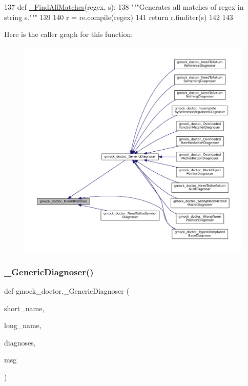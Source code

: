 \begin{DoxyCode}
137 \textcolor{keyword}{def }\hyperlink{namespacegmock__doctor_af9f6b7d876afcfe52864f2b928f5e6ab}{\_FindAllMatches}(regex, s):
138   \textcolor{stringliteral}{"""Generates all matches of regex in string s."""}
139 
140   r = re.compile(regex)
141   \textcolor{keywordflow}{return} r.finditer(s)
142 
143 
\end{DoxyCode}
Here is the caller graph for this function\+:
\nopagebreak
\begin{figure}[H]
\begin{center}
\leavevmode
\includegraphics[width=350pt]{namespacegmock__doctor_af9f6b7d876afcfe52864f2b928f5e6ab_icgraph}
\end{center}
\end{figure}
\mbox{\label{namespacegmock__doctor_af5023d3e12d1f4a7171c6b035783de84}} 
\subsubsection{\texorpdfstring{\+\_\+\+Generic\+Diagnoser()}{\_GenericDiagnoser()}}
{\footnotesize\ttfamily def gmock\+\_\+doctor.\+\_\+\+Generic\+Diagnoser (\begin{DoxyParamCaption}\item[{}]{short\+\_\+name,  }\item[{}]{long\+\_\+name,  }\item[{}]{diagnoses,  }\item[{}]{msg }\end{DoxyParamCaption})\hspace{0.3cm}{\ttfamily [private]}}

